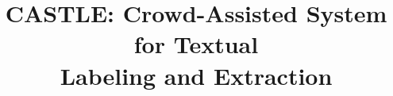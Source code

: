 \documentclass{sig-alternate}
\begin{document}
%

\title{{\ttlit CASTLE}: Crowd-Assisted System for Textual\\
Labeling and Extraction}
%
%
%
%
%
\end{document}
